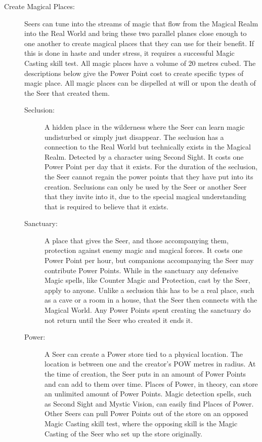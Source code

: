 \begin{description}
\item[Create Magical Places:] Seers can tune into the streams of magic that flow from the Magical Realm into the Real World and bring these two parallel planes close enough to one another to create magical places that they can use for their benefit. If this is done in haste and under stress, it requires a successful Magic Casting skill test. All magic places have a volume of 20 metres cubed. The descriptions below give the Power Point cost to create specific types of magic place. All magic places can be dispelled at will or upon the death of the Seer that created them.
\begin{description}
\item[Seclusion:] A hidden place in the wilderness where the Seer can learn magic undisturbed or simply just disappear. The seclusion has a connection to the Real World but technically exists in the Magical Realm. Detected by a character using Second Sight. It costs one Power Point per day that it exists. For the duration of the seclusion, the Seer cannot regain the power points that they have put into its creation. Seclusions can only be used by the Seer or another Seer that they invite into it, due to the special magical understanding that is required to believe that it exists.
\item[Sanctuary:] A place that gives the Seer, and those accompanying them, protection against enemy magic and magical forces. It costs one Power Point per hour, but companions accompanying the Seer may contribute Power Points. While in the sanctuary any defensive Magic spells, like Counter Magic and Protection, cast by the Seer, apply to anyone. Unlike a seclusion this has to be a real place, such as a cave or a room in a house, that the Seer then connects with the Magical World. Any Power Points spent creating the sanctuary do not return until the Seer who created it ends it.
\item[Power:] A Seer can create a Power store tied to a physical location. The location is between one and the creator’s POW metres in radius. At the time of creation, the Seer puts in an amount of Power Points and can add to them over time. Places of Power, in theory, can store an unlimited amount of Power Points. Magic detection spells, such as Second Sight and Mystic Vision, can easily find Places of Power. Other Seers can pull Power Points out of the store on an opposed Magic Casting skill test, where the opposing skill is the Magic Casting of the Seer who set up the store originally.
\end{description}
\end{description}


